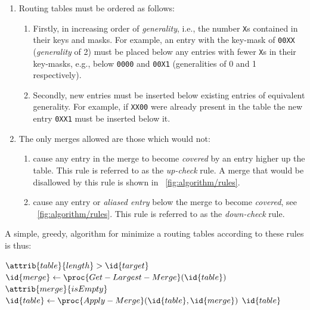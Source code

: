 \documentclass[conference]{IEEEtran}
\newcommand{\mytt}[1]{\texttt{\footnotesize#1}}
\begin{document}
  \begin{enumerate}[\IEEEsetlabelwidth{3)}]
    \item Routing tables must be ordered as follows:
      \begin{enumerate}[\IEEEsetlabelwidth{a)}]
        \item Firstly, in increasing order of \textit{generality}, i.e., the number \mytt{X}s contained in their keys and masks.
              For example, an entry with the key-mask of \mytt{00XX} (\textit{generality} of 2) must be placed below any entries with fewer \mytt{X}s in their key-masks, e.g., below \mytt{0000} and \mytt{00X1} (generalities of 0 and 1 respectively).
        \item Secondly, new entries must be inserted below existing entries of equivalent generality.
              For example, if \mytt{XX00} were already present in the table the new entry \mytt{0XX1} must be inserted below it.
      \end{enumerate}
    \item The only merges allowed are those which would not:
      \begin{enumerate}[\IEEEsetlabelwidth{b)}]
        \item cause any entry in the merge to become \textit{covered} by an entry higher up the table.
              This rule is referred to as the \textit{up-check} rule.
              A merge that would be disallowed by this rule is shown in \figurename~\ref{fig:algorithm/rules}.
            \item cause any entry or \textit{aliased entry} below the merge to become \textit{covered}, see \figurename~\ref{fig:algorithm/rules}.
              This rule is referred to as the \textit{down-check} rule.
      \end{enumerate}
  \end{enumerate}

  A simple, greedy, algorithm for minimize a routing tables according to these rules is thus:\par\nopagebreak
  \begin{codebox}
    \li \While $\attrib{table}{length} >  \id{target}$
    \li \Do $\id{merge} \gets \proc{Get-Largest-Merge}(\id{table})$
    \li     \If $\attrib{merge}{isEmpty}$
    \li     \Then {} \End
    \li     $\id{table} \gets \proc{Apply-Merge}(\id{table}, \id{merge})$
        \End
    \li \Return $\id{table}$
  \end{codebox}
\end{document}
